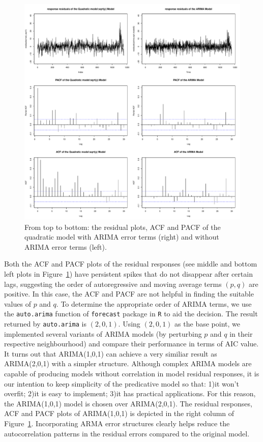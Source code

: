 \documentclass [11pt, proquest] {uwthesis}[2015/03/03]
\begin{document}
\begin{figure}
   \includegraphics[width=1\textwidth]{figures/residual_acfpcf} 
  \caption{From top to bottom: the residual plots, ACF and PACF of the quadratic model with ARIMA error terms (right) and without ARIMA error terms (left).}
  \label{fig:residual_acfpcf}
\end{figure}


Both the ACF and PACF plots of the residual responses (see middle and bottom left plots in Figure~\ref{fig:residual_acfpcf}) have persistent spikes that do not disappear after certain lags, suggesting the order of autoregressive and moving average terms $(p,q)$ are positive. In this case, the ACF and PACF are not helpful in finding the suitable values of $p$ and $q$. To determine the appropriate order of ARIMA terms, we use the \texttt{auto.arima} function of \texttt{forecast} package in \texttt{R} to aid the decision. The result returned by \texttt{auto.arima} is $(2,0,1)$. Using $(2,0,1)$ as the base point, we implemented several variants of ARIMA models (by perturbing $p$ and $q$ in their respective neighbourhood) and compare their performance in terms of AIC value. It turns out that ARIMA(1,0,1) can achieve a very similiar result as ARIMA(2,0,1) with a simpler structure. Although complex ARIMA models are capable of producing models without correlation in model residual responses, it is our intention to keep simplicity of the predicative model so that: 1)it won't overfit; 2)it is easy to implement; 3)it has practical applications. For this reason, the ARIMA(1,0,1) model is chosen over ARIMA(2,0,1). The residual responses, ACF and PACF plots of ARIMA(1,0,1) is depicted in the right column of Figure~\ref{fig:residual_acfpcf}. Incorporating ARMA error structures clearly helps reduce the autocorrelation patterns in the residual errors compared to the original model.
 
\end{document}
